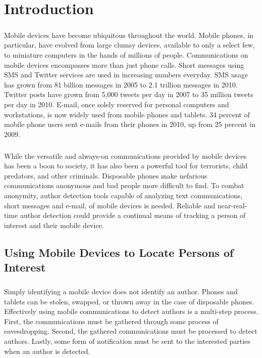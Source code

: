 \chapter{Introduction}
\paragraph*{} Mobile devices have become ubiquitous throughout the world.  Mobile phones, in particular, have evolved from large clumsy devices, available to only a select few, to miniature computers in the hands of millions of people.  Communications on mobile devices encompasses more than just phone calls.  Short messages using SMS and Twitter services are used in increasing numbers everyday.  SMS usage has grown from 81 billion messages in 2005 to 2.1 trillion messages in 2010. \cite{_u.s._????} Twitter posts have grown from 5,000 tweets per day in 2007 to 35 million tweets per day in 2010.\cite{_twitter_????} E-mail, once solely reserved for personal computers and workstations, is now widely used from mobile phones and tablets.  34 percent of mobile phone users sent e-mails from their phones in 2010, up from 25 percent in 2009. \cite{smith_mobile_2010}
\paragraph*{} While the versatile and always-on communications provided by mobile devices has been a boon to society, it has also been a powerful tool for terrorists, child predators, and other criminals.  Disposable phones make nefarious communications anonymous and bad people more difficult to find.  To combat anonymity, author detection tools capable of analyzing text communications, short messages and e-mail, of mobile devices is needed.  Reliable and near-real-time author detection could provide a continual means of tracking a person of interest and their mobile device.

\section{Using Mobile Devices to Locate Persons of Interest}
\paragraph*{} Simply identifying a mobile device does not identify an author.  Phones and tablets can be stolen, swapped, or thrown away in the case of disposable phones. Effectively using mobile communications to detect authors is a multi-step process.  First, the communications must be gathered through some process of eavesdropping. Second, the gathered communications must be processed to detect authors.  Lastly, some form of notification must be sent to the interested parties when an author is detected.
